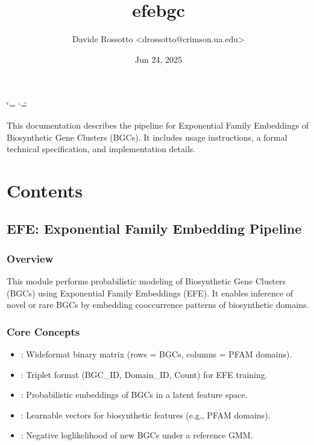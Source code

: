 \documentclass[letterpaper,10pt,english]{sphinxmanual}
\title{efe\sphinxhyphen{}bgc}
\date{Jun 24, 2025}
\author{Davide Rossotto \textless{}drossotto@crimson.ua.edu\textgreater{}}
\begin{document}
\ifdefined\shorthandoff
  \ifnum\catcode`\=\string=\active\shorthandoff{=}\fi
  \ifnum\catcode`\"=\active{}\fi
\fi

\pagestyle{empty}
\sphinxmaketitle
\pagestyle{plain}
\sphinxtableofcontents
\pagestyle{normal}
\label{\detokenize{index::doc}}


\sphinxAtStartPar
This documentation describes the  pipeline for Exponential Family Embeddings of Biosynthetic Gene Clusters (BGCs). It includes usage instructions, a formal technical specification, and implementation details.


\chapter{Contents}
\label{\detokenize{index:contents}}
\sphinxstepscope


\section{EFE: Exponential Family Embedding Pipeline}
\label{\detokenize{efe-bgc_technical_spec:efe-exponential-family-embedding-pipeline}}\label{\detokenize{efe-bgc_technical_spec::doc}}

\subsection{Overview}
\label{\detokenize{efe-bgc_technical_spec:overview}}
\sphinxAtStartPar
This module performs probabilistic modeling of Biosynthetic Gene Clusters (BGCs)
using Exponential Family Embeddings (EFE). It enables inference of novel or rare BGCs
by embedding co\sphinxhyphen{}occurrence patterns of biosynthetic domains.


\subsection{Core Concepts}
\label{\detokenize{efe-bgc_technical_spec:core-concepts}}\begin{itemize}
\item {} 
\sphinxAtStartPar
{}: Wide\sphinxhyphen{}format binary matrix (rows = BGCs, columns = PFAM domains).

\item {} 
\sphinxAtStartPar
{}: Triplet format (BGC\_ID, Domain\_ID, Count) for EFE training.

\item {} 
\sphinxAtStartPar
{}: Probabilistic embeddings of BGCs in a latent feature space.

\item {} 
\sphinxAtStartPar
{}: Learnable vectors for biosynthetic features (e.g., PFAM domains).

\item {} 
\sphinxAtStartPar
{}: Negative log\sphinxhyphen{}likelihood of new BGCs under a reference GMM.

\end{itemize}
\end{document}
